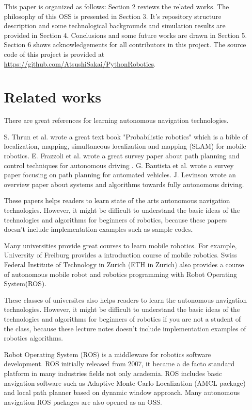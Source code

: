 \documentclass{bmvc2k}
\begin{document}
This paper is organized as follows: Section 2 reviews the related works. The philosophy of this OSS is presented in Section 3. It's repository structure description and some technological backgrounds and simulation results are provided in Section 4. Conclusions and some future works are drawn in Section 5. Section 6 shows acknowledgements for all contributors  in this project. The source code of this project is provided at \url{https://github.com/AtsushiSakai/PythonRobotics}.


\section{Related works}

There are great references for learning autonomous navigation technologies.

S. Thrun et al. wrote a great text book "Probabilistic robotics" which is a bible of localization, mapping, simultaneous localization and mapping (SLAM) for mobile robotics\cite{PR}.
E. Frazzoli et al. wrote a great survey paper about path planning and control techniques for autonomous driving \cite{pathtracking}.
G. Bautista et al. wrote a survey paper focusing on path planning for automated vehicles\cite{pathplanning}.
J. Levinson wrote an overview paper about systems and algorithms towards fully autonomous driving\cite{Levinson2011}.

These papers helps readers to learn state of the arts autonomous navigation technologies.
However, it might be difficult to understand the basic ideas of the technologies and algorithms for beginners of robotics, because these papers doesn't include implementation examples such as sample codes.

Many universities provide great courses to learn mobile robotics.
For example, University of Freiburg provides a introduction course of mobile robotics\cite{course1}.
Swiss Federal Institute of Technology in Zurich (ETH in Zurich) also provides a course of autonomous mobile robot\cite{course2} and robotics programming with Robot Operating System(ROS)\cite{course3}.

These classes of universites also helps readers to learn the autonomous navigation technologies.
However, it might be difficult to understand the basic ideas of the technologies and algorithms for beginners of robotics if you are not a student of the class, because these lecture notes doesn't include implementation examples of robotics algorithms.

Robot Operating System (ROS) is a middleware for robotics software development\cite{ros}\cite{rospaper}.
ROS initially released from 2007, it became a de facto standard platform in many industries fields not only academia.
ROS includes basic navigation software such as Adaptive Monte Carlo Localization (AMCL package) and local path planner based on dynamic window approach\cite{rosnavigation}.
Many autonomous navigation ROS packages are also opened as an OSS.
\end{document}
